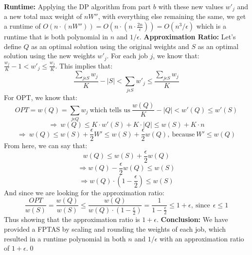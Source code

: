\documentclass[oneside]{homework} %
\begin{document}
\textbf{Runtime:} 
\newline
Applying the DP algorithm from part $b$ with these new values $w'_j$ and a new total max weight of $nW''$, with everything else remaining the same, we get a runtime of $O(n\cdot(nW'')) = O(n\cdot(n\cdot\frac{2n}{\epsilon})) = O(n^3/\epsilon)$ which is a runtime that is both polynomial in $n$ and $1/\epsilon$.
\newline
\newline
\textbf{Approximation Ratio:} 
\newline
Let's define $Q$ as an optimal solution using the original weights and $S$ as an optimal solution using the new weights $w'_j$.
\newline
For each job $j$, we know that: $\frac{w_j}{K} - 1 < w'_j \leq \frac{w_j}{K}$. This implies that: 
$$\frac{\sum\limits_{j\epsilon S}w_j}{K} - |S| < \sum\limits_{j\epsilon S}w'_j \leq \frac{\sum\limits_{j\epsilon S}w_j}{K}$$
For OPT, we know that: 
$$OPT = w(Q) = \sum\limits_{j\epsilon Q}w_j \ \text{which tells us} \ \frac{w(Q)}{K} - |Q| < w'(Q) \leq w'(S)$$ 
$$\Longrightarrow \ w(Q) \leq K \cdot w'(S) + K \cdot |Q| \leq w(S) + K \cdot n$$
$$\Longrightarrow \ w(Q) \leq w(S) + \frac{\epsilon}{2}W' \leq w(S) + \frac{\epsilon}{2}w(Q), \ \text{because} \ W' \leq w(Q)$$
From here, we can say that:
$$w(Q) \leq w(S) + \frac{\epsilon}{2}w(Q)$$
$$\Longrightarrow w(Q) - \frac{\epsilon}{2}w(Q) \leq w(S)$$
$$\Longrightarrow w(Q) \cdot (1 - \frac{\epsilon}{2}) \leq w(S)$$
And since we are looking for the approximation ratio:
$$\frac{OPT}{w(S)} = \frac{w(Q)}{w(S)} \leq \frac{w(Q)}{w(Q) \cdot (1 - \frac{\epsilon}{2})} = \frac{1}{1 - \frac{\epsilon}{2}} \leq 1 + \epsilon, \ \text{since} \ \ \epsilon \leq 1$$
Thus showing that the approximation ratio is $1 + \epsilon$.
\newline
\newline
\textbf{Conclusion:} We have provided a FPTAS by scaling and rounding the weights of each job, which resulted in a runtime polynomial in both $n$ and $1/\epsilon$ with an approximation ratio of $1 + \epsilon$.\hfill\qed
\end{document}
